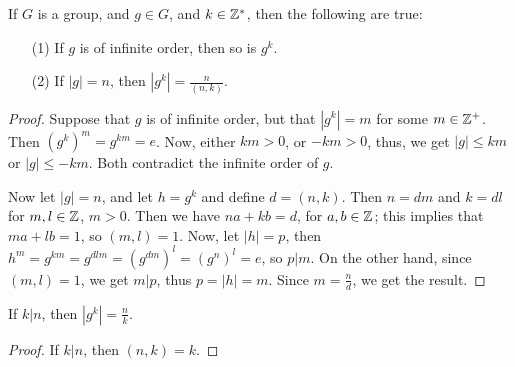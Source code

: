 \begin{proposition}\label{proposition_2.3.6}
  If $G$ is a group, and  $g \in G$, and  $k \in \mathbb{Z}^*$, then the following are
  true:
  \begin{enumerate}
    \item[(1)] If $g$ is of infinite order, then so is  $g^k$.

    \item[(2)] If $|g|=n$, then  $|g^k|=\frac{n}{(n,k)}$.
  \end{enumerate}
\end{proposition}
\begin{proof}
  Suppose that $g$ is of infinite order, but that $|g^k|=m$ for some $m
  \in \mathbb{Z}^+$. Then  $(g^k)^m=g^{km}=e$. Now, either $km>0$, or  $-km>0$, thus,
  we get  $|g| \leq km$ or $|g| \leq -km$. Both contradict the
  infinite order of $g$.

  Now let  $|g|=n$, and let $h=g^k$ and define  $d=(n,k)$. Then $n=dm$ and
  $k=dl$ for  $m,l \in \mathbb{Z}$,  $m>0$. Then we have $na+kb=d$, for $a,b \in \mathbb{Z}$;
  this implies that  $ma+lb=1$, so  $(m,l)=1$. Now, let $|h|=p$, then
  $h^m=g^{km}=g^{dlm}=(g^{dm})^l=(g^n)^l=e$, so $p|m$. On the other hand,
  since  $(m,l)=1$, we get $m|p$, thus  $p=|h|=m$. Since $m=\frac{n}{d}$,
  we get the result.
\end{proof}
\begin{corollary}
  If $k|n$, then  $|g^k|=\frac{n}{k}$.
\end{corollary}
\begin{proof}
  If $k|n$, then  $(n,k)=k$.
\end{proof}


